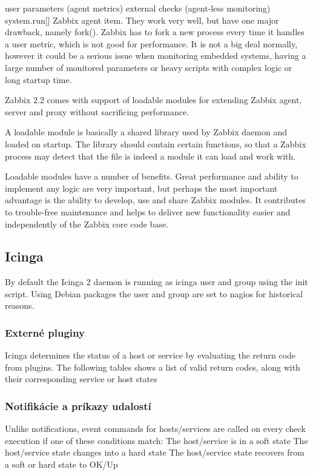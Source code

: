 \documentclass[11pt,final,oneside]{fithesis}
\begin{document}
user parameters (agent metrics)
external checks (agent-less monitoring)
system.run[] Zabbix agent item.
They work very well, but have one major drawback, namely fork(). Zabbix has to fork a new process every time it handles a user metric, which is not good for performance. It is not a big deal normally, however it could be a serious issue when monitoring embedded systems, having a large number of monitored parameters or heavy scripts with complex logic or long startup time.

Zabbix 2.2 comes with support of loadable modules for extending Zabbix agent, server and proxy without sacrificing performance.

A loadable module is basically a shared library used by Zabbix daemon and loaded on startup. The library should contain certain functions, so that a Zabbix process may detect that the file is indeed a module it can load and work with.

Loadable modules have a number of benefits. Great performance and ability to implement any logic are very important, but perhaps the most important advantage is the ability to develop, use and share Zabbix modules. It contributes to trouble-free maintenance and helps to deliver new functionality easier and independently of the Zabbix core code base.
\cite{06}

\subsection{Icinga}
By default the Icinga 2 daemon is running as icinga user and group using the init script. Using Debian packages the user and group are set to nagios for historical reasons.
\cite{07}

\subsubsection{Externé pluginy}
Icinga determines the status of a host or service by evaluating the return code from plugins. The following tables shows a list of valid return codes, along with their corresponding service or host states
\cite{08}

\subsubsection{Notifikácie a príkazy udalostí}
Unlike notifications, event commands for hosts/services are called on every check execution if one of these conditions match:
The host/service is in a soft state
The host/service state changes into a hard state
The host/service state recovers from a soft or hard state to OK/Up
\end{document}
